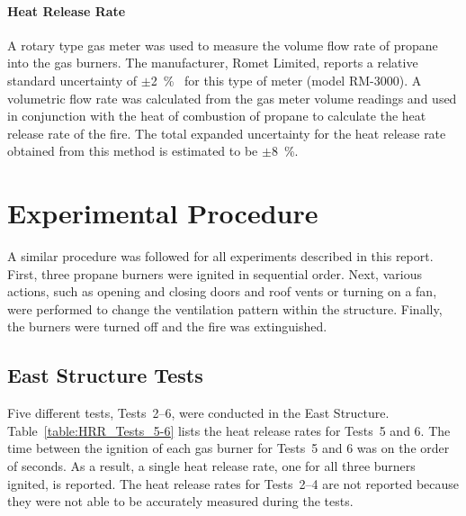 \documentclass[12pt,oneside]{book}
\begin{document}
\subsubsection{Heat Release Rate}
A rotary type gas meter was used to measure the volume flow rate of propane into the gas burners. The manufacturer, Romet Limited, reports a relative standard uncertainty of $\pm$2~\%~\cite{Romet:2014} for this type of meter (model RM-3000). A volumetric flow rate was calculated from the gas meter volume readings and used in conjunction with the heat of combustion of propane to calculate the heat release rate of the fire. The total expanded uncertainty for the heat release rate obtained from this method is estimated to be $\pm8$~\%.


\chapter{Experimental Procedure}
\label{chap:Experimental_Procedure}
A similar procedure was followed for all experiments described in this report. First, three propane burners were ignited in sequential order. Next, various actions, such as opening and closing doors and roof vents or turning on a fan, were performed to change the ventilation pattern within the structure. Finally, the burners were turned off and the fire was extinguished.

\section{East Structure Tests}
\label{sec:east_procedure}
Five different tests, Tests~2--6, were conducted in the East Structure. Table~\ref{table:HRR_Tests_5-6} lists the heat release rates for Tests~5 and 6. The time between the ignition of each gas burner for Tests~5 and 6 was on the order of seconds. As a result, a single heat release rate, one for all three burners ignited, is reported. The heat release rates for Tests~2--4 are not reported because they were not able to be accurately measured during the tests. 
\end{document}
